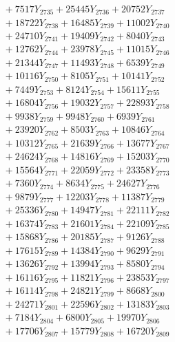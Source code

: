 \documentclass[a4paper,10pt]{article}
\begin{document}
{\begin{align}
&\;  + 7517 Y_{2735} + 25445 Y_{2736} + 20752 Y_{2737} \\[0.3ex]
&\;  + 18722 Y_{2738} + 16485 Y_{2739} + 11002 Y_{2740} \\[0.3ex]
&\;  + 24710 Y_{2741} + 19409 Y_{2742} + 8040 Y_{2743} \\[0.3ex]
&\;  + 12762 Y_{2744} + 23978 Y_{2745} + 11015 Y_{2746} \\[0.3ex]
&\;  + 21344 Y_{2747} + 11493 Y_{2748} + 6539 Y_{2749} \\[0.3ex]
&\;  + 10116 Y_{2750} + 8105 Y_{2751} + 10141 Y_{2752} \\[0.3ex]
&\;  + 7449 Y_{2753} + 8124 Y_{2754} + 15611 Y_{2755} \\[0.3ex]
&\;  + 16804 Y_{2756} + 19032 Y_{2757} + 22893 Y_{2758} \\[0.5ex]\allowbreak
&\;  + 9938 Y_{2759} + 9948 Y_{2760} + 6939 Y_{2761} \\[0.3ex]
&\;  + 23920 Y_{2762} + 8503 Y_{2763} + 10846 Y_{2764} \\[0.3ex]
&\;  + 10312 Y_{2765} + 21639 Y_{2766} + 13677 Y_{2767} \\[0.3ex]
&\;  + 24624 Y_{2768} + 14816 Y_{2769} + 15203 Y_{2770} \\[0.3ex]
&\;  + 15564 Y_{2771} + 22059 Y_{2772} + 23358 Y_{2773} \\[0.3ex]
&\;  + 7360 Y_{2774} + 8634 Y_{2775} + 24627 Y_{2776} \\[0.3ex]
&\;  + 9879 Y_{2777} + 12203 Y_{2778} + 11387 Y_{2779} \\[0.3ex]
&\;  + 25336 Y_{2780} + 14947 Y_{2781} + 22111 Y_{2782} \\[0.3ex]
&\;  + 16374 Y_{2783} + 21601 Y_{2784} + 22109 Y_{2785} \\[0.3ex]
&\;  + 15868 Y_{2786} + 20185 Y_{2787} + 9126 Y_{2788} \\[0.5ex]\allowbreak
&\;  + 17615 Y_{2789} + 14384 Y_{2790} + 9629 Y_{2791} \\[0.3ex]
&\;  + 13626 Y_{2792} + 13994 Y_{2793} + 8580 Y_{2794} \\[0.3ex]
&\;  + 16116 Y_{2795} + 11821 Y_{2796} + 23853 Y_{2797} \\[0.3ex]
&\;  + 16114 Y_{2798} + 24821 Y_{2799} + 8668 Y_{2800} \\[0.3ex]
&\;  + 24271 Y_{2801} + 22596 Y_{2802} + 13183 Y_{2803} \\[0.3ex]
&\;  + 7184 Y_{2804} + 6800 Y_{2805} + 19970 Y_{2806} \\[0.3ex]
&\;  + 17706 Y_{2807} + 15779 Y_{2808} + 16720 Y_{2809} \\[0.3ex]

\end{align}}
\end{document}
